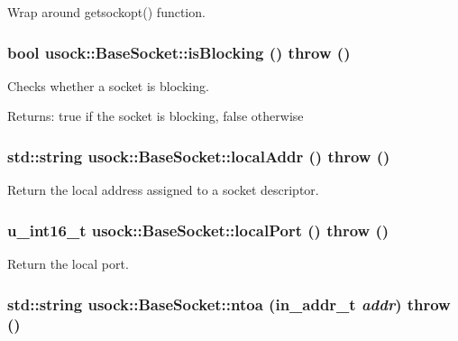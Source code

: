 Wrap around getsockopt() function. 

\hypertarget{classusock_1_1BaseSocket_d29a1fabc8b4c7a86cd236473ef03177}{
\subsubsection[{isBlocking}]{\setlength{\rightskip}{0pt plus 5cm}bool usock::BaseSocket::isBlocking ()  throw ()}}
\label{classusock_1_1BaseSocket_d29a1fabc8b4c7a86cd236473ef03177}


Checks whether a socket is blocking. 

\begin{Desc}
\item[Returns:]true if the socket is blocking, false otherwise \end{Desc}
\hypertarget{classusock_1_1BaseSocket_479da55516dcda8117a356d8a3be3d83}{
\subsubsection[{localAddr}]{\setlength{\rightskip}{0pt plus 5cm}std::string usock::BaseSocket::localAddr ()  throw ()}}
\label{classusock_1_1BaseSocket_479da55516dcda8117a356d8a3be3d83}


Return the local address assigned to a socket descriptor. 

\hypertarget{classusock_1_1BaseSocket_47218f0ff53693f2891573ec47d84f36}{
\subsubsection[{localPort}]{\setlength{\rightskip}{0pt plus 5cm}u\_\-int16\_\-t usock::BaseSocket::localPort ()  throw ()}}
\label{classusock_1_1BaseSocket_47218f0ff53693f2891573ec47d84f36}


Return the local port. 

\hypertarget{classusock_1_1BaseSocket_3da108b8c23df3b521ded0bc4ae5295c}{
\subsubsection[{ntoa}]{\setlength{\rightskip}{0pt plus 5cm}std::string usock::BaseSocket::ntoa (in\_\-addr\_\-t {\em addr})  throw ()}}
\label{classusock_1_1BaseSocket_3da108b8c23df3b521ded0bc4ae5295c}


